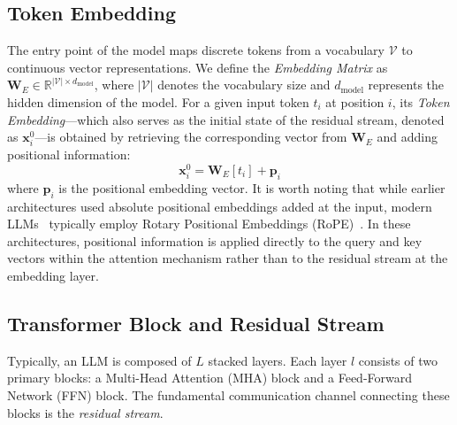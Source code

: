 \documentclass[11pt,letterpaper]{mystyle}
\begin{document}


\subsection{Token Embedding}
\label{sec:token_embedding}
The entry point of the model maps discrete tokens from a vocabulary $\mathcal{V}$ to continuous vector representations. We define the \textit{Embedding Matrix} as $\mathbf{W}_E \in \mathbb{R}^{|\mathcal{V}| \times d_{\text{model}}}$, where $|\mathcal{V}|$ denotes the vocabulary size and $d_{\text{model}}$ represents the hidden dimension of the model.
For a given input token $t_i$ at position $i$, its \textit{Token Embedding}---which also serves as the initial state of the residual stream, denoted as $\mathbf{x}_i^0$---is obtained by retrieving the corresponding vector from $\mathbf{W}_E$ and adding positional information:
\begin{equation}
\mathbf{x}_i^0 = \mathbf{W}_E[t_i] + \mathbf{p}_i
\end{equation}
\noindent where $\mathbf{p}_i$ is the positional embedding vector. It is worth noting that while earlier architectures used absolute positional embeddings added at the input, modern LLMs~\citep{dubey2024llama,openai2024gpt4technicalreport,qwen2025qwen25technicalreport} typically employ Rotary Positional Embeddings (RoPE)~\citep{su2024roformer}. In these architectures, positional information is applied directly to the query and key vectors within the attention mechanism rather than to the residual stream at the embedding layer.

\subsection{Transformer Block and Residual Stream}
\label{sect:block_stream}
Typically, an LLM is composed of $L$ stacked layers. Each layer $l$ consists of two primary blocks: a Multi-Head Attention (MHA) block and a Feed-Forward Network (FFN) block. The fundamental communication channel connecting these blocks is the \textit{residual stream}.
\end{document}
